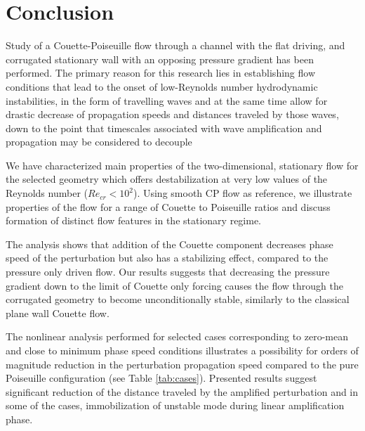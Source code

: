 \documentclass[lineno]{jfm}
\begin{document}

\section{Conclusion} \label{sec:conclusion}
Study of a Couette-Poiseuille flow through a channel with the flat driving, and corrugated stationary wall with an opposing pressure gradient has been performed.
The primary reason for this research lies in establishing flow conditions that lead to the onset of low-Reynolds number hydrodynamic instabilities, in the form of travelling waves and at the same time allow for drastic decrease of propagation speeds and distances traveled by those waves, down to the point that timescales associated with wave amplification and propagation may be considered to decouple 

We have characterized main properties of the two-dimensional, stationary flow for the selected geometry which offers destabilization at very low values of the Reynolds number ($Re_{cr}<10^2$).
Using smooth CP flow as reference, we illustrate properties of the flow for a range of Couette to Poiseuille ratios and discuss formation of distinct flow features in the stationary regime.

The analysis shows that addition of the Couette component decreases phase speed of the perturbation but also has a stabilizing effect, compared to the pressure only driven flow.
Our results suggests that decreasing the pressure gradient down to the limit of Couette only forcing causes the flow through the corrugated geometry to become unconditionally stable, similarly to the classical plane wall Couette flow.

The nonlinear analysis performed for selected cases corresponding to zero-mean and close to minimum phase speed conditions illustrates a possibility for orders of magnitude reduction in the perturbation propagation speed compared to the pure Poiseuille configuration (see Table \ref{tab:cases}).
Presented results suggest significant reduction of the distance traveled by the amplified perturbation and in some of the cases, immobilization of   unstable mode during linear amplification phase.
\end{document}
